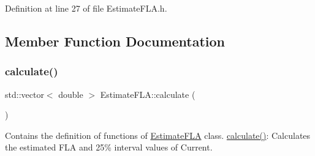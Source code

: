 Definition at line 27 of file Estimate\+F\+L\+A.\+h.



\subsection{Member Function Documentation}
\mbox{\label{class_estimate_f_l_a_ae8601d58dbeab855ade2e3f06ccf6cec}} 
\subsubsection{\texorpdfstring{calculate()}{calculate()}}
{\footnotesize\ttfamily std\+::vector$<$ double $>$ Estimate\+F\+L\+A\+::calculate (\begin{DoxyParamCaption}{ }\end{DoxyParamCaption})}



Contains the definition of functions of \hyperlink{class_estimate_f_l_a}{Estimate\+F\+LA} class. \hyperlink{class_estimate_f_l_a_ae8601d58dbeab855ade2e3f06ccf6cec}{calculate()}\+: Calculates the estimated F\+LA and 25\% interval values of Current. 

